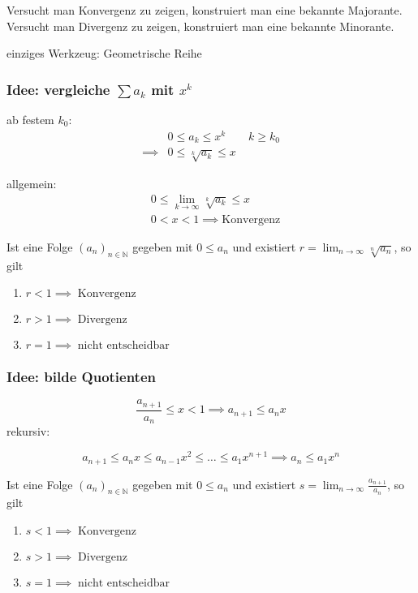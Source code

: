 Versucht man Konvergenz zu zeigen, konstruiert man eine bekannte Majorante.\newline
Versucht man Divergenz zu zeigen, konstruiert man eine bekannte Minorante. \newline

\noindent einziges Werkzeug: Geometrische Reihe

\subsubsection*{Idee: vergleiche $ \sum a_k $ mit $x^k$}
ab festem \( k_0 \):
\begin{align*}
	&0 \leq a_k \leq x^k \qquad k \geq k_0 \\
	\implies &0 \leq \sqrt[k]{a_k} \leq x
\end{align*}

\noindent allgemein:
\begin{align*}
	&0 \leq \lim_{k\rightarrow\infty} \sqrt[k]{a_k} \leq x \\
	&0 < x < 1 \implies \text{Konvergenz}
\end{align*}

\begin{theorem}[Wurzelkriterium]
\label{theorem:Wurzelkriterium}
		Ist eine Folge \( (a_n)_{n \in \mathbb{N}} \) gegeben mit \( 0 \leq a_n \) und existiert \( r = \lim_{n\rightarrow\infty} \sqrt[n]{a_n} \), so gilt
		\begin{enumerate}
			\item \( r < 1 \implies \; \text{Konvergenz} \)
			\item \( r > 1 \implies \; \text{Divergenz} \)
			\item \( r = 1 \implies \; \text{nicht entscheidbar} \)
		\end{enumerate}
\end{theorem}

\subsubsection*{Idee: bilde Quotienten} %
\label{sub:bilde_quotienten}

\[
	\frac{a_{n+1}}{a_n} \leq x < 1 \implies a_{n+1} \leq a_n x
\]
rekursiv:

\[
	a_{n+1} \leq a_nx \leq a_{n-1}x^2\leq \ldots \leq a_1x^{n+1} \implies a_n \leq a_1x^n
\]

\begin{theorem}[Quotientenkriterium]
	Ist eine Folge \( (a_n)_{n \in \mathbb{N} } \) gegeben mit \( 0 \leq a_n \) und existiert \( s = \lim_{n\rightarrow\infty} \frac{a_{n+1}}{a_n} \), so gilt
	\begin{enumerate}
		\item \( s < 1 \implies \; \text{Konvergenz} \)
		\item \( s > 1 \implies \; \text{Divergenz} \)
		\item \( s = 1 \implies \; \text{nicht entscheidbar} \)
	\end{enumerate}
\end{theorem}

